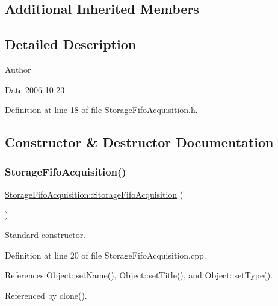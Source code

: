 \subsection*{Additional Inherited Members}


\subsection{Detailed Description}
\begin{DoxyAuthor}{Author}

\end{DoxyAuthor}
\begin{DoxyDate}{Date}
2006-\/10-\/23 
\end{DoxyDate}


Definition at line 18 of file Storage\+Fifo\+Acquisition.\+h.



\subsection{Constructor \& Destructor Documentation}
\mbox{\label{classStorageFifoAcquisition_a32975d5adfb2fbeeaf18b50be5fb58fe}} 
\subsubsection{\texorpdfstring{Storage\+Fifo\+Acquisition()}{StorageFifoAcquisition()}}
{\footnotesize\ttfamily \hyperlink{classStorageFifoAcquisition_1_1StorageFifoAcquisition}{Storage\+Fifo\+Acquisition\+::\+Storage\+Fifo\+Acquisition} (\begin{DoxyParamCaption}{ }\end{DoxyParamCaption})}



Standard constructor. 



Definition at line 20 of file Storage\+Fifo\+Acquisition.\+cpp.



References Object\+::set\+Name(), Object\+::set\+Title(), and Object\+::set\+Type().



Referenced by clone().


